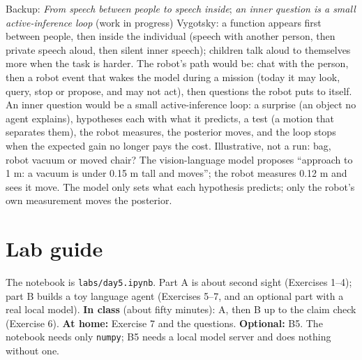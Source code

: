 \documentclass[11pt]{article}
\begin{document}
\begin{backupbox}{Backup: \emph{From speech between people to speech inside}; \emph{an inner question is a small active-inference loop} (work in progress)}
Vygotsky: a function appears first between people, then inside the individual (speech with another person, then private speech aloud, then silent inner speech); children talk aloud to themselves more when the task is harder. The robot's path would be: chat with the person, then a robot event that wakes the model during a mission (today it may look, query, stop or propose, and may not act), then questions the robot puts to itself. An inner question would be a small active-inference loop: a surprise (an object no agent explains), hypotheses each with what it predicts, a test (a motion that separates them), the robot measures, the posterior moves, and the loop stops when the expected gain no longer pays the cost. Illustrative, not a run: bag, robot vacuum or moved chair? The vision-language model proposes ``approach to 1 m: a vacuum is under 0.15 m tall and moves''; the robot measures 0.12 m and sees it move. The model only sets what each hypothesis predicts; only the robot's own measurement moves the posterior.
\end{backupbox}

\section{Lab guide}

The notebook is \texttt{labs/day5.ipynb}. Part A is about second sight (Exercises 1--4); part B builds a toy language agent (Exercises 5--7, and an optional part with a real local model). \textbf{In class} (about fifty minutes): A, then B up to the claim check (Exercise 6). \textbf{At home:} Exercise 7 and the questions. \textbf{Optional:} B5. The notebook needs only \texttt{numpy}; B5 needs a local model server and does nothing without one.
\end{document}
